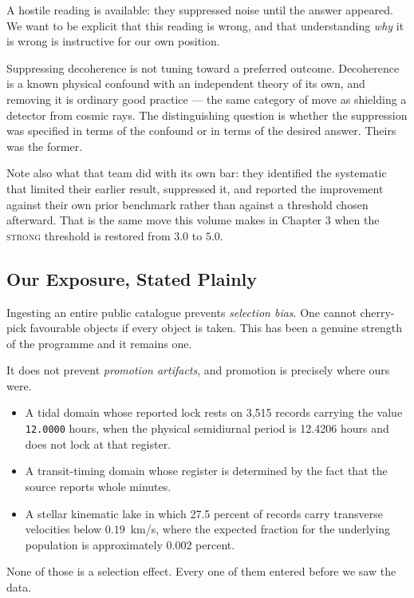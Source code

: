 \documentclass[11pt, letterpaper, openany]{book}
\begin{document}
A hostile reading is available: they suppressed noise until the answer appeared. We want to be
explicit that this reading is wrong, and that understanding \emph{why} it is wrong is
instructive for our own position.

Suppressing decoherence is not tuning toward a preferred outcome. Decoherence is a known
physical confound with an independent theory of its own, and removing it is ordinary good
practice --- the same category of move as shielding a detector from cosmic rays. The
distinguishing question is whether the suppression was specified in terms of the confound or
in terms of the desired answer. Theirs was the former.

Note also what that team did with its own bar: they identified the systematic that limited
their earlier result, suppressed it, and reported the improvement against their own prior
benchmark rather than against a threshold chosen afterward. That is the same move this volume makes in Chapter 3 when the
\textsc{strong} threshold is restored from $3.0$ to $5.0$.

\subsection{Our Exposure, Stated Plainly}

Ingesting an entire public catalogue prevents \emph{selection bias}. One cannot cherry-pick
favourable objects if every object is taken. This has been a genuine strength of the programme
and it remains one.

It does not prevent \emph{promotion artifacts}, and promotion is precisely where ours were.

\begin{itemize}
    \item A tidal domain whose reported lock rests on 3{,}515 records carrying the value
          \texttt{12.0000} hours, when the physical semidiurnal period is 12.4206 hours and
          does not lock at that register.
    \item A transit-timing domain whose register is determined by the fact that the source
          reports whole minutes.
    \item A stellar kinematic lake in which 27.5 percent of records carry transverse velocities
          below $0.19$~km/s, where the expected fraction for the underlying population is
          approximately $0.002$ percent.
\end{itemize}

None of those is a selection effect. Every one of them entered before we saw the data.
\end{document}
